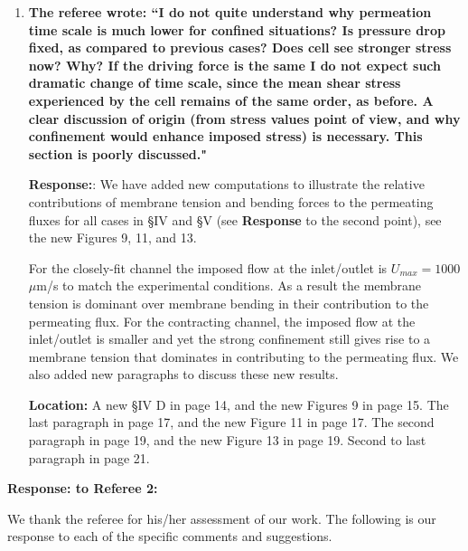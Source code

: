 \documentclass[12pt]{article}
\begin{document}
\begin{enumerate}
\item{\bf
The referee wrote:
``I do not quite understand why permeation time scale is much lower
for confined situations? Is pressure drop fixed, as compared to
previous cases? Does cell see stronger stress now? Why? If the driving
force is the same I do not expect such dramatic change of time scale,
since the mean shear stress experienced by the cell remains of the
same order, as before. A clear discussion of origin (from stress
values point of view, and why confinement would enhance imposed
stress) is necessary. This section is poorly discussed."}

\noindent
{\bf Response:}:  We have added new computations to illustrate the relative contributions of membrane tension and bending forces to the permeating fluxes for all cases in \S IV and \S V (see {\bf Response} to the second point), see the new Figures 9, 11, and 13.

For the closely-fit channel the imposed flow at the inlet/outlet is
$U_{max}=1000$ $\mu$m/s to match the experimental conditions. As a
result the membrane tension is dominant over membrane bending in their
contribution to the permeating flux. For the contracting channel, the
imposed flow at the inlet/outlet is smaller and yet the strong
confinement still gives rise to a membrane tension that dominates in
contributing to the permeating flux. We also added new paragraphs to
discuss these new results.

\noindent
{\bf Location:} A new \S IV D in page 14, and the new Figures 9 in page 15. The last paragraph in page 17, and the new Figure 11 in page 17. The second paragraph in page 19, and the new Figure 13 in page 19. Second to last paragraph in page 21.

\end{enumerate}

\newpage
\vspace{0.5cm}
{\large \bf {\bf Response:} to Referee 2:}
\vspace{0.5cm}

We thank the referee for his/her assessment of our work.  
The following is
our response to each of the specific comments and suggestions.
\end{document}
